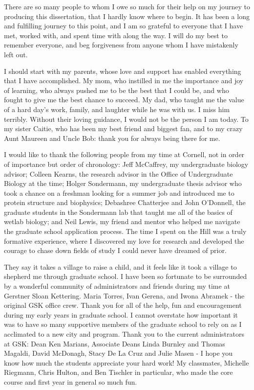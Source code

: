 \documentclass[phd,tocprelim]{cornell}
\DeclareRobustCommand{\gobblefive}[5]{}
\newcommand*{\SkipTocEntry}{\addtocontents{toc}{\gobblefive}}
\begin{document}
\SkipTocEntry\begin{acknowledgements}
There are so many people to whom I owe so much for their help on my journey to producing this dissertation, that I hardly know where to begin. It has been a long and fulfilling journey to this point, and I am so grateful to everyone that I have met, worked with, and spent time with along the way. I will do my best to remember everyone, and beg forgiveness from anyone whom I have mistakenly left out. 

I should start with my parents, whose love and support has enabled everything that I have accomplished. My mom, who instilled in me the importance and joy of learning, who always pushed me to be the best that I could be, and who fought to give me the best chance to succeed. My dad, who taught me the value of a hard day's work, family, and laughter while he was with us. I miss him terribly. Without their loving guidance, I would not be the person I am today. To my sister Caitie, who has been my best friend and biggest fan, and to my crazy Aunt Maureen and Uncle Bob: thank you for always being there for me. 

I would like to thank the following people from my time at Cornell, not in order of importance but order of chronology: Jeff McCaffrey, my undergraduate biology advisor; Colleen Kearns, the research advisor in the Office of Undergraduate Biology at the time; Holger Sondermann, my undergraduate thesis advisor who took a chance on a freshman looking for a summer job and introduced me to protein structure and biophysics; Debashree Chatterjee and John O'Donnell, the graduate students in the Sondermann lab that taught me all of the basics of wetlab biology; and Neil Lewis, my friend and mentor who helped me navigate the graduate school application process. The time I spent on the Hill was a truly formative experience, where I discovered my love for research and developed the courage to chase down fields of study I could never have dreamed of prior. 

They say it takes a village to raise a child, and it feels like it took a village to shepherd me through graduate school. I have been so fortunate to be surrounded by a wonderful community of administrators and friends during my time at Gerstner Sloan Kettering. Maria Torres, Ivan Gerena, and Iwona Abramek - the original GSK office crew. Thank you for all of the help, fun and encouragement during my early years in graduate school. I cannot overstate how important it was to have so many supportive members of the graduate school to rely on as I acclimated to a new city and program. Thank you to the current administrators at GSK: Dean Ken Marians, Associate Deans Linda Burnley and Thomas Magaldi, David McDonagh, Stacy De La Cruz and Julie Masen - I hope you know how much the students appreciate your hard work!  My classmates, Michelle Riegmann, Chris Hulton, and Ben Tischler in particular, who made the core course and first year in general so much fun. 


\end{acknowledgements}
\end{document}
